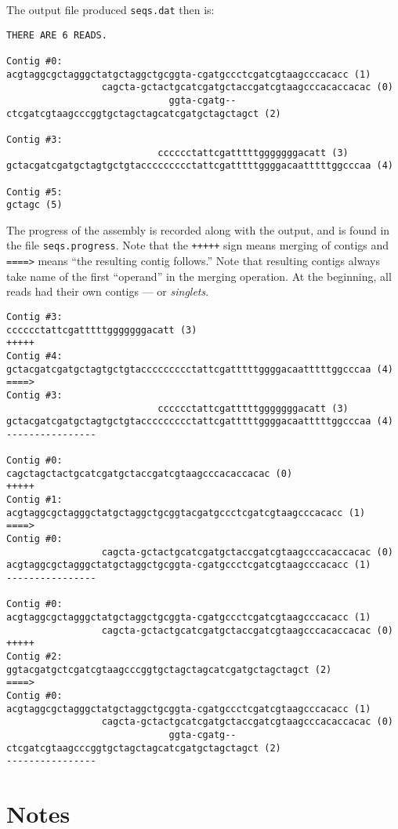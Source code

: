 \documentclass[11pt, oneside]{article}
\begin{document}
The output file produced {\tt seqs.dat} then is:
\scriptsize
\begin{verbatim}
THERE ARE 6 READS.

Contig #0:
acgtaggcgctagggctatgctaggctgcggta-cgatgccctcgatcgtaagcccacacc (1) 
                 cagcta-gctactgcatcgatgctaccgatcgtaagcccacaccacac (0) 
                             ggta-cgatg--ctcgatcgtaagcccggtgctagctagcatcgatgctagctagct (2) 

Contig #3:
                           cccccctattcgatttttgggggggacatt (3) 
gctacgatcgatgctagtgctgtaccccccccctattcgatttttggggacaatttttggcccaa (4) 

Contig #5:
gctagc (5) 
\end{verbatim}
\normalsize

The progress of the assembly is recorded along with the output, and is found
in the file {\tt seqs.progress}. Note that the {\tt +++++} sign means
merging of contigs and {\tt ====>} means ``the resulting contig follows.''
Note that resulting contigs always take name of the first ``operand'' in the merging operation.
At the beginning, all reads had their own contigs --- or \emph{singlets}.  

\scriptsize
\begin{verbatim}
Contig #3:
cccccctattcgatttttgggggggacatt (3) 
+++++ 
Contig #4:
gctacgatcgatgctagtgctgtaccccccccctattcgatttttggggacaatttttggcccaa (4) 
====> 
Contig #3:
                           cccccctattcgatttttgggggggacatt (3) 
gctacgatcgatgctagtgctgtaccccccccctattcgatttttggggacaatttttggcccaa (4) 
----------------

Contig #0:
cagctagctactgcatcgatgctaccgatcgtaagcccacaccacac (0) 
+++++ 
Contig #1:
acgtaggcgctagggctatgctaggctgcggtacgatgccctcgatcgtaagcccacacc (1) 
====> 
Contig #0:
                 cagcta-gctactgcatcgatgctaccgatcgtaagcccacaccacac (0) 
acgtaggcgctagggctatgctaggctgcggta-cgatgccctcgatcgtaagcccacacc (1) 
----------------

Contig #0:
acgtaggcgctagggctatgctaggctgcggta-cgatgccctcgatcgtaagcccacacc (1) 
                 cagcta-gctactgcatcgatgctaccgatcgtaagcccacaccacac (0) 
+++++ 
Contig #2:
ggtacgatgctcgatcgtaagcccggtgctagctagcatcgatgctagctagct (2) 
====> 
Contig #0:
acgtaggcgctagggctatgctaggctgcggta-cgatgccctcgatcgtaagcccacacc (1) 
                 cagcta-gctactgcatcgatgctaccgatcgtaagcccacaccacac (0) 
                             ggta-cgatg--ctcgatcgtaagcccggtgctagctagcatcgatgctagctagct (2) 
----------------
\end{verbatim}
\normalsize

\section{Notes}
\end{document}
